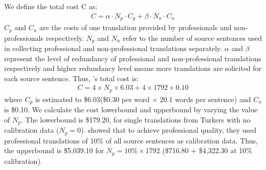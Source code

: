 \documentclass[11pt,letterpaper]{article}
\begin{document}
We define the total cost C as:
 \begin{align*}
  C = \alpha \cdot N_{p} \cdot C_{p}  + \beta \cdot N_{n} \cdot C_{n} 
  \end{align*}
$C_{p}$ and $C_{n}$ are the costs of one translation provided by professionals and non-professionals respectively.
$N_{p}$ and $N_{n}$ refer to the number of source sentences used in collecting professional and non-professional translations separately.
$\alpha$ and $\beta$ represent the level of redundancy of professional and non-professional translations respectively and higher redundancy level means more translations are solicited for each source sentence. Thus, 's total cost is:
\begin{align*}
  C = 4 \times N_{p} \times 6.03  + 4 \times 1792 \times 0.10 
  \end{align*}
 where $C_{p}$ is estimated to \$6.03(\$0.30 per word $\times$ 20.1 words per sentence) and $C_{n}$ is \$0.10. We calculate the cost lowerbound and upperbound by varying the value of $N_{p}$. The lowerbound is \$179.20, for single translations from Turkers with no calibration data ($N_{p} = 0$).  showed that to achieve professional quality, they used professional translations of 10\% of all source sentences as calibration data. Thus, the upperbound is \$5,039.10 for $N_{p} = 10\% \times 1792$ (\$716.80 + \$4,322.30 at 10\% calibration).  
  
\end{document}
